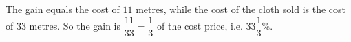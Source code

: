 The gain equals the cost of $11$ metres, while the cost of the cloth sold is the cost of $33$ metres. So the gain is $\dfrac{11}{33}=\dfrac13$ of the cost price, i.e. $\boxed{33\dfrac13\%}$.
